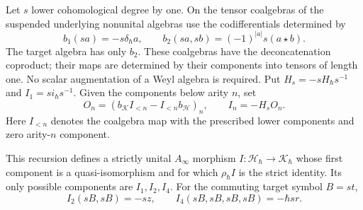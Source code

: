 Let $s$ lower cohomological degree by one.
On the tensor coalgebras of the suspended underlying nonunital
algebras use the codifferentials determined by
\[
 b_1(sa)=-s\delta_\hbar a,\qquad
 b_2(sa,sb)=(-1)^{|a|}s(a\star b).
\]
The target algebra has only $b_2$.
These coalgebras have the deconcatenation coproduct; their maps
are determined by their components into tensors of length one.
No scalar augmentation of a Weyl algebra is required.
Put $H_s=-sH_\hbar s^{-1}$ and $I_1=si_\hbar s^{-1}$.
Given the components below arity $n$, set
\begin{equation}\label{eq:vol2-relative-inverse-recursion}
 O_n=(b_{\mathcal K}I_{<n}-I_{<n}b_{\mathcal H})_n,
 \qquad I_n=-H_sO_n.
\end{equation}
Here $I_{<n}$ denotes the coalgebra map with the prescribed
lower components and zero arity-$n$ component.

\begin{theorem}\label{thm:vol2-relative-higher-inverse}
This recursion defines a strictly unital $A_\infty$ morphism
$I:\mathcal H_\hbar\to\mathcal K_\hbar$ whose first component
is a quasi-isomorphism and for which $\rho_\hbar I$ is the
strict identity. Its only possible components are $I_1,I_2,I_4$.
For the commuting target symbol $B=st$,
\begin{equation}\label{eq:vol2-relative-fourth-inverse}
 I_2(sB,sB)=-sz,\qquad
 I_4(sB,sB,sB,sB)=-\hbar sr.
\end{equation}
\end{theorem}

